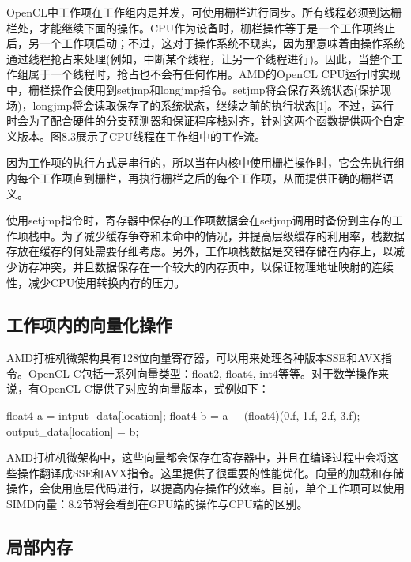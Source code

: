 
OpenCL中工作项在工作组内是并发，可使用栅栏进行同步。所有线程必须到达栅栏处，才能继续下面的操作。CPU作为设备时，栅栏操作等于是一个工作项终止后，另一个工作项启动；不过，这对于操作系统不现实，因为那意味着由操作系统通过线程抢占来处理(例如，中断某个线程，让另一个线程进行)。因此，当整个工作组属于一个线程时，抢占也不会有任何作用。AMD的OpenCL CPU运行时实现中，栅栏操作会使用到setjmp和longjmp指令。setjmp将会保存系统状态(保护现场)，longjmp将会读取保存了的系统状态，继续之前的执行状态[1]。不过，运行时会为了配合硬件的分支预测器和保证程序栈对齐，针对这两个函数提供两个自定义版本。图8.3展示了CPU线程在工作组中的工作流。


因为工作项的执行方式是串行的，所以当在内核中使用栅栏操作时，它会先执行组内每个工作项直到栅栏，再执行栅栏之后的每个工作项，从而提供正确的栅栏语义。

使用setjmp指令时，寄存器中保存的工作项数据会在setjmp调用时备份到主存的工作项栈中。为了减少缓存争夺和未命中的情况，并提高层级缓存的利用率，栈数据存放在缓存的何处需要仔细考虑。另外，工作项栈数据是交错存储在内存上，以减少访存冲突，并且数据保存在一个较大的内存页中，以保证物理地址映射的连续性，减少CPU使用转换内存的压力。

\subsection{工作项内的向量化操作}

AMD打桩机微架构具有128位向量寄存器，可以用来处理各种版本SSE和AVX指令。OpenCL C包括一系列向量类型：float2, float4, int4等等。对于数学操作来说，有OpenCL C提供了对应的向量版本，式例如下：

\begin{codebox}[cpp]
float4 a = intput_data[location];
float4 b = a + (float4)(0.f, 1.f, 2.f, 3.f);
output_data[location] = b;
\end{codebox}

AMD打桩机微架构中，这些向量都会保存在寄存器中，并且在编译过程中会将这些操作翻译成SSE和AVX指令。这里提供了很重要的性能优化。向量的加载和存储操作，会使用底层代码进行，以提高内存操作的效率。目前，单个工作项可以使用SIMD向量：8.2节将会看到在GPU端的操作与CPU端的区别。

\subsection{局部内存}


